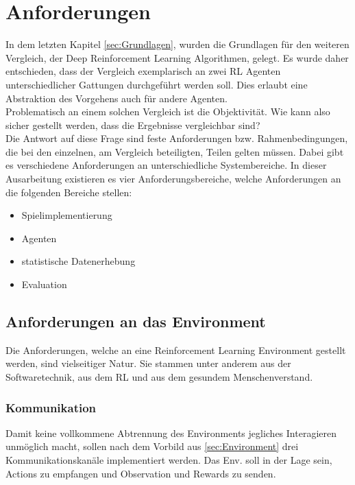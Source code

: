 \chapter{Anforderungen} \label{chap:Anforderungen}
In dem letzten Kapitel \ref{sec:Grundlagen}, wurden die Grundlagen für den weiteren Vergleich, der Deep Reinforcement Learning Algorithmen, gelegt. Es wurde daher entschieden, dass der Vergleich exemplarisch an zwei RL Agenten unterschiedlicher Gattungen durchgeführt werden soll. Dies erlaubt eine Abstraktion des Vorgehens auch für andere Agenten.\\
Problematisch an einem solchen Vergleich ist die Objektivität. Wie kann also sicher gestellt werden, dass die Ergebnisse vergleichbar sind?\\
Die Antwort auf diese Frage sind feste Anforderungen bzw. Rahmenbedingungen, die bei den einzelnen, am Vergleich beteiligten, Teilen gelten müssen. Dabei gibt es verschiedene Anforderungen an unterschiedliche Systembereiche. In dieser Ausarbeitung existieren es vier Anforderungsbereiche, welche Anforderungen an die folgenden Bereiche stellen:
\begin{itemize}
	\item Spielimplementierung
	\item Agenten
	\item statistische Datenerhebung
	\item Evaluation
\end{itemize}

\section{Anforderungen an das Environment}
Die Anforderungen, welche an eine Reinforcement Learning Environment gestellt werden, sind vielseitiger Natur. Sie stammen unter anderem aus der Softwaretechnik, aus dem RL und aus dem gesundem Menschenverstand.

\subsection{Kommunikation}
Damit keine vollkommene Abtrennung des Environments jegliches Interagieren unmöglich macht, sollen nach dem Vorbild aus \ref{sec:Environment} drei Kommunikationskanäle implementiert werden. Das Env. soll in der Lage sein, Actions zu empfangen und Observation und Rewards zu senden.

